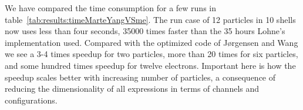 We have compared the time consumption for a few runs in table~\ref{tab:results:timeMarteYangVSme}.
The run case of 12 particles in 10 shells now uses less than four seconds, 35000 times faster than the 35 hours Lohne's implementation used.
Compared with the optimized code of Jørgensen and Wang we see a 3-4 times speedup for two particles, more than 20 times for six particles, and some hundred times speedup for twelve electrons.
Important here is how the speedup scales better with increasing number of particles, a consequence of reducing the dimensionality of all expressions in terms of channels and configurations.
\begin{table}
\begin{center}
\caption{Wall time used for running coupled-cluster calculations with $\omega = 1.0$ and a standard interaction. Iterations stop after the energy converges to $1\cdot 10^{-7}$. Time is measured either in seconds or [mm:ss]. Prev. is the previous program from~\cite{marte}, cur. is the current implementation running GPU accelerated.}
\label{tab:results:timeMarteYangVSme}
\hspace{5mm}
\end{center}
\end{table}


